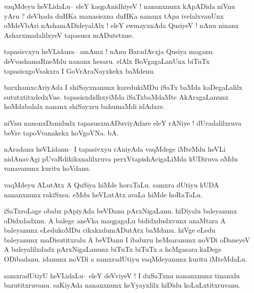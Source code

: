 \documentclass{article}
\begin{document}
\begin{mn}%
vaqMdeyu heVLidaLu-- eleY kaqpAnidhiyeV ! nananxnunx kApADida niVnu yAru ? deVhada duHKa 
manasisxna duHKa nananx tApa ivelalxvanUnx oMdeVbAri nAshamADideyalAlx ! eleY swmayxnAda 
QusiyeV ! nAnu ninanx AsharxmadalilxyeV tapasusx mADutetxne.
\end{mn}

\begin{mn}%
tapasisvxyu heVLidanu-- amAmx ! nAnu BaradAvxja Qusiya maganu. deVvashamaRneMdu nananx 
hesaru. elAlx BoVgagaLanUnx biTuTx tapasisxgoVsakxra I GoVrAraNayxkekx baMdenu.
\end{mn}

\begin{mn}%
barxhamxcAriyAda I shiSayxnanunx karedukiMDu iSaTx baMda kaDegaLalilx sututxtitxdedxVne. 
tapasisxdidhxyiMda iSaTxbaMdaMte AkAragaLanunx hoMdabalalx nananx shiSayxru bahumaMdi 
idAdxre.
\end{mn}

\begin{mn}%
niVnu nanonxDanidudx tapasusxmADuviyAdare eleY rANiye ! dUradalilxruva beVre tapoVvanakekx 
hoVgoVNa. bA.
\end{mn}

\begin{mn}%
nAradanu heVLidanu-- I tapasivxyu rAniyAda vaqMdege iMteMdu heVLi nidAnavAgi 
pUvaRdikikxnalilxruva perxVtapishAcigaLiMda kUDiruva oMdu vanavanunx kuritu hoVdanu.
\end{mn}

\begin{mn}%
vaqMdeyu ALutAtx A QuSiya hiMde horaTaLu. samxra dUtiyu kUDA nananxnunx rakiSxsu. eMdu 
heVLutAtx avaLa hiMde hoRaTaLu. 
\end{mn}

\begin{mn}%
iSaTxroLage obabx pApiyAda beVDanu pArxNigaLanu. hiDiyalu baleyanunx oDidxdadxnu. A balege 
aneVka maqgagaLu bididxdudxvunx anaMtara A baleyanunx eLedukoMDu cikakxdumADutAtx baMdanu. 
hiVge eLedu baleyanunx maDisutitxralu A beVDanu I ibabxru heMsaranunx noVDi oDaneyeV A 
baleyalilxdadx pArxNigaLanunx biTuTx biTuTx a heMgasara kaDege ODibadanu. idanunx noVDi a 
samxradUtiyu vaqMdeyanunx kuritu iMteMdaLu.
\end{mn}

\begin{mn}%
samxradUtiyU heVLidaLu-- eleY deVviyeV ! I duSaTxnu nananxnunx tinanxlu barutitxruvanu. 
saKiyAda nananxnunx keYyayxlilx hiDidu koLuLxtitxruvanu.
\end{mn}
\end{document}
